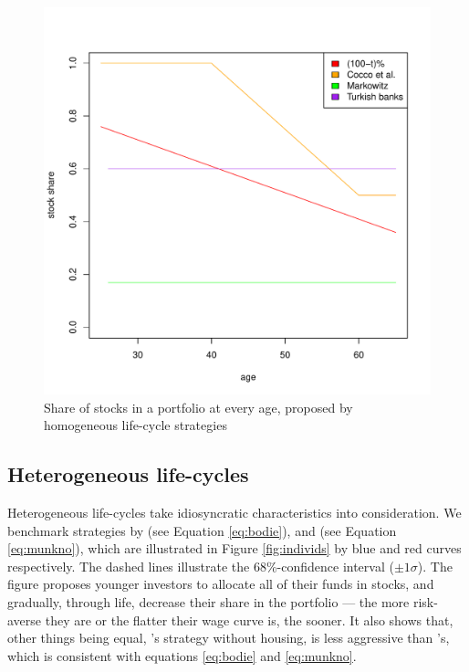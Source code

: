 \begin{figure}[h!]
	\centering
	\includegraphics[scale=0.4]{figs/defaults.pdf}
	\caption{Share of stocks in a portfolio at every age, proposed by homogeneous life-cycle strategies}
	\label{fig:defaults}
\end{figure}


\subsection{Heterogeneous life-cycles}

Heterogeneous life-cycles take idiosyncratic characteristics into consideration. We benchmark strategies by \citet{bodie} (see Equation \ref{eq:bodie}), and \citet{munk} (see Equation \ref{eq:munkno}), which are illustrated in Figure \ref{fig:individs} by blue and red curves respectively. The dashed lines illustrate the $68\%$-confidence interval ($\pm 1\sigma$). The figure proposes younger investors to allocate all of their funds in stocks, and gradually, through life, decrease their share in the portfolio --- the more risk-averse they are or the flatter their wage curve is, the sooner. It also shows that, other things being equal, \citet{munk}'s strategy without housing, is less aggressive than \citet{bodie}'s, which is consistent with equations \ref{eq:bodie} and \ref{eq:munkno}. 

